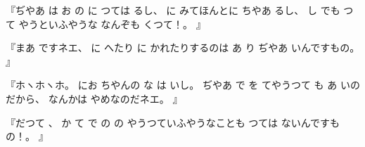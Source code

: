 『ぢやあ
は
お
の
に
つては
るし、
に
みてほんとに
ちやあ
るし、
し
でも
つて
やうといふやうな
なんぞも
くつて！。
』

『まあ
ですネエ、
に
へたり
に
かれたりするのは
あ
り
ぢやあ
いんですもの。
』

『ホヽホヽホ。
にお
ちやんの
な
は
いし。
ぢやあ
で
を
てやうつて
も
あ
いのだから、
なんかは
やめなのだネエ。
』

『だつて
、
か
て
で
の
の
やうつていふやうなことも
つては
ないんですもの！。
』

